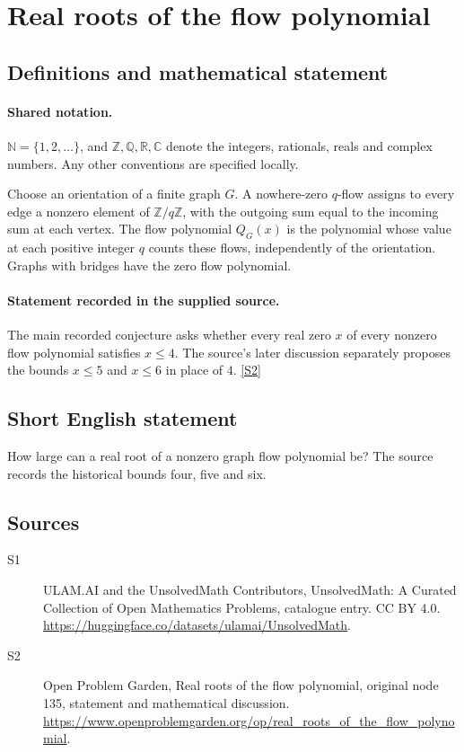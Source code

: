 \documentclass[11pt]{article}
\newcommand{\sref}[2]{\hyperlink{source:#1:#2}{[S#2]}}
\begin{document}
\section{Real roots of the flow polynomial}\label{statement}

\subsection{Definitions and mathematical statement}

\paragraph{Shared notation.}$\mathbb N=\{1,2,\ldots\}$, and $\mathbb Z,\mathbb Q,\mathbb R,\mathbb C$ denote the integers, rationals, reals and complex numbers. Any other conventions are specified locally.


Choose an orientation of a finite graph $G$. A nowhere-zero $q$-flow assigns to every edge a nonzero element of $\mathbb Z/q\mathbb Z$, with the outgoing sum equal to the incoming sum at each vertex. The flow polynomial $Q_G(x)$ is the polynomial whose value at each positive integer $q$ counts these flows, independently of the orientation. Graphs with bridges have the zero flow polynomial.
\paragraph{Statement recorded in the supplied source.}
The main recorded conjecture asks whether every real zero $x$ of every nonzero flow polynomial satisfies $x\le4$. The source's later discussion separately proposes the bounds $x\le5$ and $x\le6$ in place of $4$. \sref{statement}{2}
\subsection{Short English statement}
How large can a real root of a nonzero graph flow polynomial be? The source records the historical bounds four, five and six.
\subsection{Sources}
\begin{description}
\item[\hypertarget{source:statement:1}{S1}] ULAM.AI and the UnsolvedMath Contributors, UnsolvedMath: A Curated Collection of Open Mathematics Problems, catalogue entry. CC BY 4.0. \url{https://huggingface.co/datasets/ulamai/UnsolvedMath}.
\item[\hypertarget{source:statement:2}{S2}] Open Problem Garden, Real roots of the flow polynomial, original node 135, statement and mathematical discussion. \url{https://www.openproblemgarden.org/op/real_roots_of_the_flow_polynomial}.
\end{description}
\label{end:statement}
\end{document}
